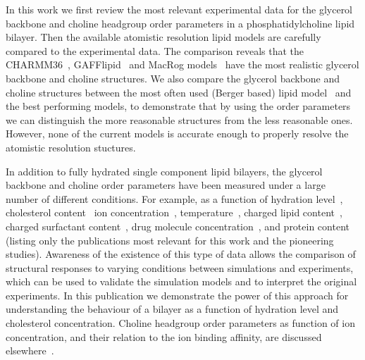\documentclass[pre,aps,floatfix,authordate1-4,twocolumn]{revtex4-1}
\begin{document}
In this work we first review the most relevant experimental data for the glycerol backbone and choline headgroup order parameters
in a phosphatidylcholine lipid bilayer. Then the available atomistic resolution lipid models are carefully compared to the 
experimental data. The comparison reveals that the CHARMM36~\cite{klauda10}, GAFFlipid~\cite{dickson12} and MacRog models~\cite{maciejewski14}
have the most realistic glycerol backbone and choline structures. We also compare the glycerol backbone and choline 
structures between the most often used (Berger based) lipid model~\cite{berger97} 
and the best performing models, to demonstrate that by using the 
order parameters we can distinguish the more reasonable structures from the less reasonable ones. However, none of the current models 
is accurate enough to properly resolve the atomistic resolution stuctures.

In addition to fully hydrated single component lipid bilayers, the glycerol backbone and choline order parameters
have been measured under a large number of different conditions. For example, as a function of hydration level~\cite{bechinger91,ulrich94,dvinskikh05b}, cholesterol content~\cite{brown78,ferreira13}
ion concentration~\cite{brown77,akutsu81,altenbach84,roux90,roux91}, temperature~\cite{gally75}, charged lipid content~\cite{roux90,roux91}, charged surfactant content~\cite{scherer89}, 
drug molecule concentration~\cite{browning82,kelusky84,castro08}, and protein content~\cite{roux89,kuchinka89} (listing only the publications most relevant for this work and the pioneering studies).
Awareness of the existence of this type of data allows the comparison of structural responses to varying conditions between simulations and experiments,
which can be used to validate the simulation models and to interpret the original experiments. 
In this publication we demonstrate the power of this approach for understanding the behaviour of a bilayer as a function of hydration level and cholesterol concentration.
Choline headgroup order parameters as function of ion concentration, and their relation to the ion binding affinity, are discussed elsewhere~\cite{ionpaper}.
\end{document}
